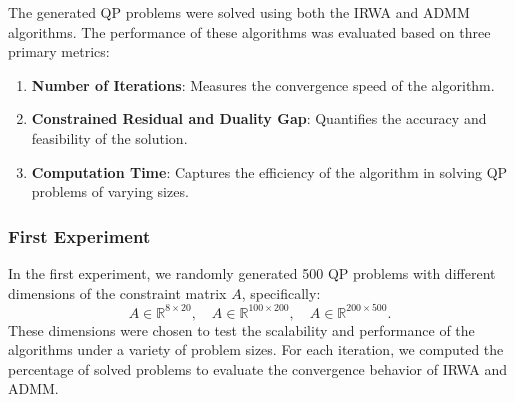 \documentclass{article}
\begin{document}
The generated QP problems were solved using both the IRWA and ADMM algorithms. The performance of these algorithms was evaluated based on three primary metrics:
\begin{enumerate}
    \item \textbf{Number of Iterations}: Measures the convergence speed of the algorithm.
    \item \textbf{Constrained Residual and Duality Gap}: Quantifies the accuracy and feasibility of the solution.
    \item \textbf{Computation Time}: Captures the efficiency of the algorithm in solving QP problems of varying sizes.
\end{enumerate}

\subsubsection{First Experiment}

In the first experiment, we randomly generated 500 QP problems with different dimensions of the constraint matrix \(A\), specifically:
\[
A \in \mathbb{R}^{8 \times 20}, \quad A \in \mathbb{R}^{100 \times 200}, \quad A \in \mathbb{R}^{200 \times 500}.
\]
These dimensions were chosen to test the scalability and performance of the algorithms under a variety of problem sizes. For each iteration, we computed the percentage of solved problems to evaluate the convergence behavior of IRWA and ADMM.
\end{document}
